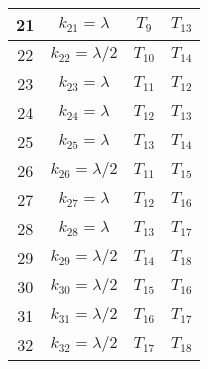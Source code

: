 \documentclass[a4paper, 12pt]{article}
\begin{document}
\begin{table}[h]
\begin{tabular}{|c|c|c|c|}
        21 & $k_{21} = \lambda$ & $T_9$ & $T_{13}$\\
        \midrule
        22 & $k_{22} = \lambda/2$ & $T_{10}$ & $T_{14}$\\
        \midrule
        23 & $k_{23} = \lambda$ & $T_{11}$ & $T_{12}$\\
        \midrule
        24 & $k_{24} = \lambda$ & $T_{12}$ & $T_{13}$\\
        \midrule
        25 & $k_{25} = \lambda$ & $T_{13}$ & $T_{14}$\\
        \midrule
        26 & $k_{26} = \lambda/2$ & $T_{11}$ & $T_{15}$\\
        \midrule
        27 & $k_{27} = \lambda$ & $T_{12}$ & $T_{16}$\\
        \midrule
        28 & $k_{28} = \lambda$ & $T_{13}$ & $T_{17}$\\
        \midrule
        29 & $k_{29} = \lambda/2$ & $T_{14}$ & $T_{18}$\\
        \midrule
        30 & $k_{30} = \lambda/2$ & $T_{15}$ & $T_{16}$\\
        \midrule
        31 & $k_{31} = \lambda/2$ & $T_{16}$ & $T_{17}$\\
        \midrule
        32 & $k_{32} = \lambda/2$ & $T_{17}$ & $T_{18}$\\
        \bottomrule
    \end{tabular}
\end{table}
\end{document}
